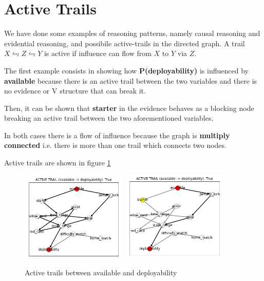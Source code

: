 \documentclass[a4paper,10pt]{report}
\begin{document}
\section{Active Trails}\label{sec:section-42}
We have done some examples of reasoning patterns, namely causal reasoning and evidential reasoning, and possibile active-trails in the directed graph. A trail $X \leftrightharpoons Z \leftrightharpoons Y$ is active if influence can flow from $X$ to $Y$ via $Z$.

The first example consists in showing how \textbf{P(deployability)} is influenced by \textbf{available} because there is an active trail between the two variables and there is no evidence or V structure that can break it.

Then, it can be shown that \textbf{starter} in the evidence behaves as a blocking node breaking an active trail between the two aforementioned variables.

In both cases there is a flow of influence because the graph is \textbf{multiply connected} i.e. there is more than one trail which connects two nodes.\newline

Active trails are shown in figure \ref{fig:first_active_trail}

\begin{figure}[h]
    \centering
    \includegraphics[width=0.45\textwidth]{assets/img/active_trail_1-1.PNG}
    \includegraphics[width=0.45\textwidth]{assets/img/active_trail_1-2.PNG}
    \caption{Active trails between available and deployability}
    \label{fig:first_active_trail}
\end{figure}
\newpage
\end{document}
